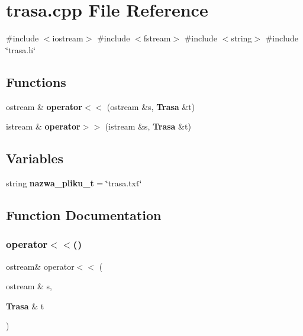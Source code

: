 \section{trasa.\+cpp File Reference}
\label{trasa_8cpp}
{\ttfamily \#include $<$iostream$>$}\newline
{\ttfamily \#include $<$fstream$>$}\newline
{\ttfamily \#include $<$string$>$}\newline
{\ttfamily \#include \char`\"{}trasa.\+h\char`\"{}}\newline
\subsection*{Functions}
\begin{DoxyCompactItemize}
\item 
ostream \& \textbf{ operator$<$$<$} (ostream \&s, \textbf{ Trasa} \&t)
\item 
istream \& \textbf{ operator$>$$>$} (istream \&s, \textbf{ Trasa} \&t)
\end{DoxyCompactItemize}
\subsection*{Variables}
\begin{DoxyCompactItemize}
\item 
string \textbf{ nazwa\+\_\+pliku\+\_\+t} = \char`\"{}trasa.\+txt\char`\"{}
\end{DoxyCompactItemize}


\subsection{Function Documentation}
\mbox{\label{trasa_8cpp_a546eedc44ac2ff4fcf2d361a8f08d9b0}} 
\subsubsection{operator$<$$<$()}
{\footnotesize\ttfamily ostream\& operator$<$$<$ (\begin{DoxyParamCaption}\item[{ostream \&}]{s,  }\item[{\textbf{ Trasa} \&}]{t }\end{DoxyParamCaption})}

\mbox{\label{trasa_8cpp_ad5f6762bbed1b1cf1bf3c1c647830346}} 
